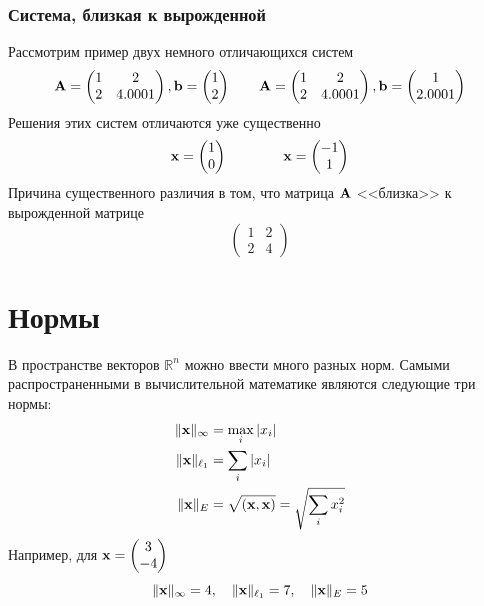 \documentclass[apectratio=43,unicode]{beamer}
\begin{document}
\begin{frame}
\frametitle{Система, близкая к вырожденной}
	Рассмотрим пример двух немного отличающихся систем
	$$
	{\mathbf{A}} = \begin{pmatrix}
		1&2\\
		2&4.0001\\
	\end{pmatrix}
	,{\mathbf{b}} = \begin{pmatrix}
		1\\2\\
	\end{pmatrix}
	\qquad
	{\mathbf{A}} = \begin{pmatrix}
		1&2\\
		2&4.0001\\
	\end{pmatrix}
	,{\mathbf{b}} = \begin{pmatrix}
		1\\2.0001\\
	\end{pmatrix}
	$$
	Решения этих систем отличаются уже существенно
	$$
	{\mathbf{x}} = \begin{pmatrix}
		1\\0
	\end{pmatrix}
	\qquad\qquad
	{\mathbf{x}} = \begin{pmatrix}
		-1\\1
	\end{pmatrix}
	$$
	Причина существенного различия в том, что матрица ${\mathbf{A}}$ <<близка>> к вырожденной матрице 
	$$
	\begin{pmatrix}
		1&2\\
		2&4
	\end{pmatrix}
	$$
\end{frame}

\section{Нормы}
{
	В пространстве векторов $\mathbb{R}^n$ можно ввести много разных норм. 
	Самыми распространенными в вычислительной математике являются 
	следующие три нормы:
	\begin{align*}
	\|{\mathbf{x}}\|_\infty &= \max_i |x_i|\\
	\|{\mathbf{x}}\|_{\ell_1} &= \sum_i |x_i|\\
	\|{\mathbf{x}}\|_E &= \sqrt{({\mathbf{x}},{\mathbf{x}})} = \sqrt{\sum_i x_i^2}
	\end{align*}
	\pause
	Например, для ${\mathbf{x}} = \begin{pmatrix}
		3\\-4
	\end{pmatrix}$
	$$
	\|{\mathbf{x}}\|_\infty = 4, \quad
	\|{\mathbf{x}}\|_{\ell_1} = 7, \quad
	\|{\mathbf{x}}\|_E = 5
	$$
}
\end{document}

